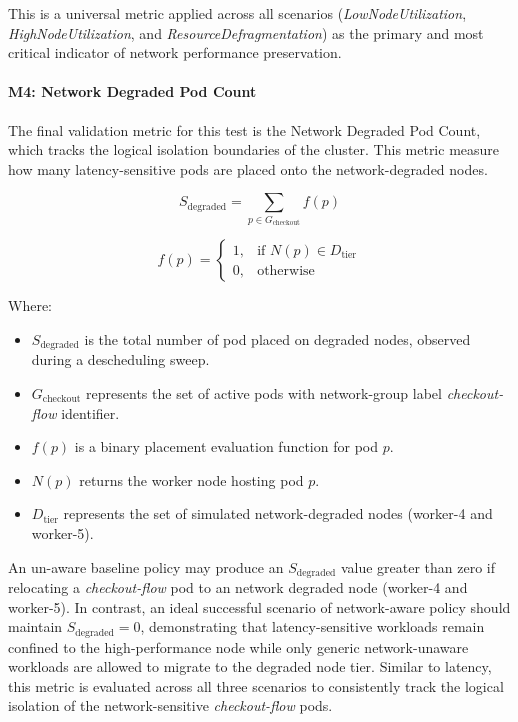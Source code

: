 This is a universal metric applied across all scenarios (\textit{LowNodeUtilization}, \textit{HighNodeUtilization}, and \textit{ResourceDefragmentation}) as the primary and most critical indicator of network performance preservation.

\paragraph{M4: Network Degraded Pod Count}
\label{subsubsec:netaware4_evaluationmetrics4}
The final validation metric for this test is the Network Degraded Pod Count, which tracks the logical isolation boundaries of the cluster. This metric measure how many latency-sensitive pods are placed onto the network-degraded nodes.

\[
S_{\text{degraded}}
=
\sum_{p \in G_{\text{checkout}}} f(p)
\]

\[
f(p)
=
\begin{cases}
1, & \text{if } N(p) \in D_{\text{tier}} \\
0, & \text{otherwise}
\end{cases}
\]

Where:

\begin{itemize}
    \item \(S_{\text{degraded}}\) is the total number of pod placed on degraded nodes, observed during a descheduling sweep.

    \item \(G_{\text{checkout}}\) represents the set of active pods with network-group label \textit{checkout-flow} identifier.

    \item \(f(p)\) is a binary placement evaluation function for pod \(p\).

    \item \(N(p)\) returns the worker node hosting pod \(p\).

    \item \(D_{\text{tier}}\) represents the set of simulated network-degraded nodes (worker-4 and worker-5).
\end{itemize}

An un-aware baseline policy may produce an \(S_{\text{degraded}}\) value greater than zero if relocating a \textit{checkout-flow} pod to an network degraded node (worker-4 and worker-5). In contrast, an ideal successful scenario of network-aware policy should maintain \(S_{\text{degraded}} = 0\), demonstrating that latency-sensitive workloads remain confined to the high-performance node while only generic network-unaware workloads are allowed to migrate to the degraded node tier. Similar to latency, this metric is evaluated across all three scenarios to consistently track the logical isolation of the network-sensitive \textit{checkout-flow} pods.

